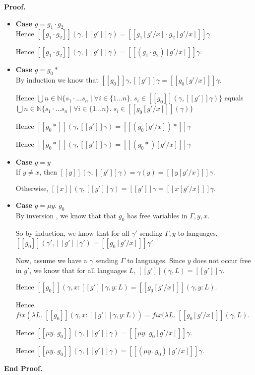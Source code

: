 \documentclass{article}
\newcommand{\fix}[2]{\mu {#1}.\;{#2}}
\newcommand{\nats}{\mathbb{N}}
\newcommand{\interp}[1]{[\![{#1}]\!]}
\newcommand{\setof}[1]{\{{#1}\}}
\newcommand{\comprehend}[2]{\setof{{#1}\;|\;{#2}}}
\newcommand{\fun}[2]{\lambda {#1}.\;{#2}}
\newenvironment{proof}{\noindent\textbf{Proof.}}{\noindent\textbf{End Proof.}}
\newenvironment{caseblock}{\begin{itemize}}{\end{itemize}}
\newenvironment{case}[1]{\item \textbf{Case} {#1}\\}{}
\begin{document}
\begin{proof}
\begin{caseblock}
\begin{case}{$g = g_1\cdot g_2$}
      Hence $\interp{g_1\cdot g_2}(\gamma, \interp{g'}\gamma) = \interp{g_1[g'/x]\cdot g_2[g'/x]}\gamma$. 

      Hence $\interp{g_1\cdot g_2}(\gamma, \interp{g'}\gamma) = \interp{(g_1\cdot g_2)[g'/x]}\gamma$. 
    \end{case}

    \begin{case}{$g = g_0*$}
      By induction we know that $\interp{g_0}{\gamma, \interp{g'}\gamma} = \interp{g_0[g'/x]}\gamma$. 

      Hence $\bigcup\limits{n \in \nats} \comprehend{s_1\cdot\ldots s_n}{\forall i \in \setof{1\ldots n}.\; s_i \in \interp{g_0}(\gamma, \interp{g'}\gamma)}$ equals\\
      $\bigcup\limits{n \in \nats} \comprehend{s_1\cdot\ldots s_n}{\forall i \in \setof{1\ldots n}.\; s_i \in \interp{g_0[g'/x]}(\gamma)}$

      Hence $\interp{g_0*}(\gamma, \interp{g'}\gamma) = \interp{(g_0[g'/x])*}\gamma$

      Hence $\interp{g_0*}(\gamma, \interp{g'}\gamma) = \interp{(g_0*)[g'/x]}\gamma$
    \end{case}

    \begin{case}{$g = y$}
      If $y \not=x$, then $\interp{y}(\gamma, \interp{g'}\gamma) = \gamma(y) = \interp{y[g'/x]}\gamma$. 

      Otherwise, $\interp{x}(\gamma, \interp{g'}\gamma) = \interp{g'}\gamma = \interp{x[g'/x]}\gamma$. 
    \end{case}

    \begin{case}{$g = \fix{y}{g_0}$}
      By inversion , we know that that $g_0$ has free variables in $\Gamma, y, x$. 

      So by induction, we know that for all $\gamma'$ sending $\Gamma, y$ to languages, 
      $\interp{g_0}(\gamma', \interp{g'}\gamma') = \interp{g_0[g'/x]}\gamma'$. 

      Now, assume we have a $\gamma$ sending $\Gamma$ to languages. Since $y$ does not 
      occur free in $g'$, we know that for all languages $L$, $\interp{g'}(\gamma, L) = \interp{g'}\gamma$. 

      Hence $\interp{g_0}(\gamma, x:\interp{g'}\gamma, y:L) = \interp{g_0[g'/x]}(\gamma, y:L)$.

      Hence $\mathit{fix}(\fun{L}{\interp{g_0}(\gamma, x:\interp{g'}\gamma, y:L)}) = \mathit{fix}(\fun{L}{\interp{g_0[g'/x]}(\gamma, L)}$. 
 
      Hence $\interp{\fix{y}{g_0}}(\gamma, \interp{g'}\gamma) = \interp{\fix{y}{g_0[g'/x]}}\gamma$. 

      Hence $\interp{\fix{y}{g_0}}(\gamma, \interp{g'}\gamma) = \interp{(\fix{y}{g_0})[g'/x]}\gamma$. 
   \end{case}
  \end{caseblock}
\end{proof}
\end{document}
